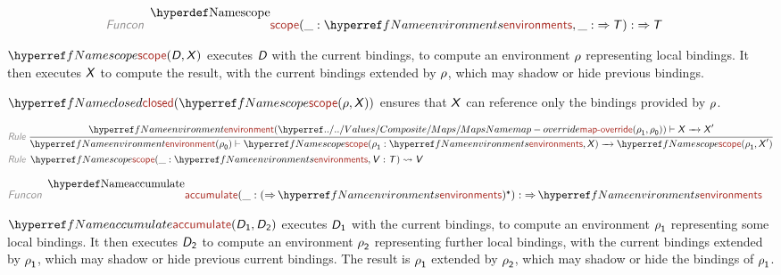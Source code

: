 \documentclass[fleqn]{article}
\begin{document}
\begin{align*}
  \KEY{Funcon} ~ 
  & \NAME[\DECL]{scope}(\_ : \NAME[\REF]{environments}, \_ :  \TO \VAR{T}) :  \TO \VAR{T}
\end{align*}


  $\NAME[\REF]{scope}
   (\VAR{D},   
    \VAR{X})$ executes ${\textsf{\textsl{D}}}$ with the current bindings, to compute an environment
  ${\textsf{\textsl{$\rho$}}}$ representing local bindings. It then executes ${\textsf{\textsl{X}}}$ to compute the result,
  with the current bindings extended by ${\textsf{\textsl{$\rho$}}}$, which may shadow or hide previous
  bindings.
  
  $\NAME[\REF]{closed}
   (\NAME[\REF]{scope}
      (\VAR{$\rho$},    
       \VAR{X}))$ ensures that ${\textsf{\textsl{X}}}$ can reference only the bindings
  provided by ${\textsf{\textsl{$\rho$}}}$.


\begin{align*}
  \KEY{Rule} ~ 
    & \RULE{
      \NAME[\REF]{environment} (\NAME[\HYPER{../../Values/Composite}{Maps}]{map-override}
                              (\VAR{$\rho$}\SUB{1},   
                               \VAR{$\rho$}\SUB{0})) \vdash \VAR{X} \TRANS \VAR{X}'
      }{
      \NAME[\REF]{environment} (\VAR{$\rho$}\SUB{0}) \vdash \NAME[\REF]{scope}
                    (\VAR{$\rho$}\SUB{1} : \NAME[\REF]{environments},   
                     \VAR{X}) \TRANS \NAME[\REF]{scope}
                                                               (\VAR{$\rho$}\SUB{1},   
                                                                \VAR{X}')
      }
\\
  \KEY{Rule} ~ 
    & \NAME[\REF]{scope}
        (\_ : \NAME[\REF]{environments},   
         \VAR{V} : \VAR{T}) \leadsto \VAR{V}
\end{align*}

\begin{align*}
  \KEY{Funcon} ~ 
  & \NAME[\DECL]{accumulate}(\_ : ( \TO \NAME[\REF]{environments})\STAR) :  \TO \NAME[\REF]{environments}
\end{align*}


  $\NAME[\REF]{accumulate}
   (\VAR{D}\SUB{1},   
    \VAR{D}\SUB{2})$ executes ${\textsf{\textsl{D}}}_{\textsf{1}}$ with the current bindings, to compute an
  environment ${\textsf{\textsl{$\rho$}}}_{\textsf{1}}$ representing some local bindings. It then executes ${\textsf{\textsl{D}}}_{\textsf{2}}$ to
  compute an environment ${\textsf{\textsl{$\rho$}}}_{\textsf{2}}$ representing further local bindings, with the
  current bindings extended by ${\textsf{\textsl{$\rho$}}}_{\textsf{1}}$, which may shadow or hide previous
  current bindings. The result is ${\textsf{\textsl{$\rho$}}}_{\textsf{1}}$ extended by ${\textsf{\textsl{$\rho$}}}_{\textsf{2}}$, which may shadow
  or hide the bindings of ${\textsf{\textsl{$\rho$}}}_{\textsf{1}}$.
  
\end{document}
